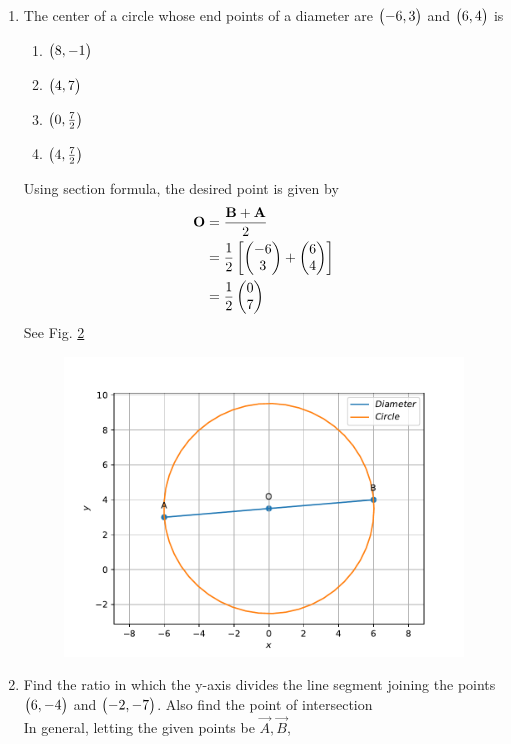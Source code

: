 \documentclass[journal,12pt,twocolumn]{IEEEtran}
\begin{document}
\begin{enumerate}
\begin{figure}
	  \caption{}
	  \label{fig:matrix-10-2.pdf}
	  \end{figure}
\item The center of a circle whose end points of a diameter are $\begin{pmatrix}-6, 3\end{pmatrix}$ and $\begin{pmatrix}6,4\end{pmatrix}$ is
\begin{enumerate}
\item $\begin{pmatrix}8,-1\end{pmatrix}$
\item $\begin{pmatrix}4,7\end{pmatrix}$
\item $\begin{pmatrix}0,\frac{7}{2}\end{pmatrix}$
\item $\begin{pmatrix}4,\frac{7}{2}\end{pmatrix}$
\end{enumerate}
		\solution 
Using section formula, 
		the desired point is given by 
  \begin{align}
	  \mathbf{O}&= \frac{\mathbf{B}+ \mathbf{A}}{2}
	  \\
	  &= \frac{1}{2}{}\left[\begin{pmatrix} -6 \\ 3\end{pmatrix}+\begin{pmatrix}6 \\ 4\end{pmatrix}\right]
	  \\
	  &=\frac{1}{2}\begin{pmatrix}0 \\ 7\end{pmatrix}
  \end{align}
    See Fig. 
	  \ref{fig:matrix-10-3.pdf}
  \begin{figure}
	  \centering 
	  \includegraphics[width=\columnwidth]{figs/matrix-10-3.pdf}
	  \caption{}
	  \label{fig:matrix-10-3.pdf}
	  \end{figure}
        \item Find the ratio in which the y-axis divides the line segment joining the points $\begin{pmatrix}6, -4\end{pmatrix}$ and $\begin{pmatrix}-2, -7\end{pmatrix}$. Also find the point of intersection\\
\solution  In general, letting the given points be $\vec{A}, \vec{B}$, 

\end{enumerate}
\end{document}
